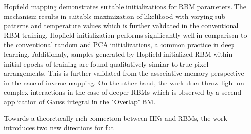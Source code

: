 \documentclass[11pt,letterpaper]{article}
\begin{document}
Hopfield mapping demonstrates suitable initializations for RBM parameters. The mechanism results in suitable maximization of likelihood with varying sub-patterns and temperature values which is further validated in the conventional RBM training. Hopfield initialization performs significantly well in comparison to the conventional random and PCA initializations, a common practice in deep learning. Additionaly, samples generated by Hopfield initialized RBM within initial epochs of training are found qualitatively similar to true pixel arrangements. This is further validated from the associative memory perspective in the case of inverse mapping. On the other hand, the work does throw light on complex interactions in the case of deeper RBMs which is observed by a second application of Gauss integral in the "Overlap" BM. 

Towards a theoretically rich connection between HNs and RBMs, the work introduces two new directions for fut
\end{document}
